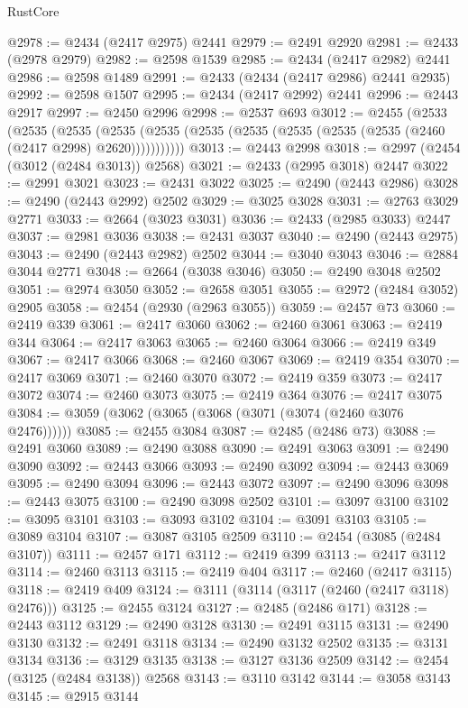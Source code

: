 \begin{lexlean}{RustCore}
\begin{coremodule}
@2978 := @2434 (@2417 @2975) @2441
@2979 := @2491 @2920
@2981 := @2433 (@2978 @2979)
@2982 := @2598 @1539
@2985 := @2434 (@2417 @2982) @2441
@2986 := @2598 @1489
@2991 := @2433 (@2434 (@2417 @2986) @2441 @2935)
@2992 := @2598 @1507
@2995 := @2434 (@2417 @2992) @2441
@2996 := @2443 @2917
@2997 := @2450 @2996
@2998 := @2537 @693
@3012 := @2455
    (@2533
      (@2535
        (@2535
          (@2535 (@2535 (@2535 (@2535 (@2535 (@2535 (@2535 (@2460 (@2417 @2998) @2620)))))))))))
@3013 := @2443 @2998
@3018 := @2997 (@2454 (@3012 (@2484 @3013)) @2568)
@3021 := @2433 (@2995 @3018) @2447
@3022 := @2991 @3021
@3023 := @2431 @3022
@3025 := @2490 (@2443 @2986)
@3028 := @2490 (@2443 @2992) @2502
@3029 := @3025 @3028
@3031 := @2763 @3029 @2771
@3033 := @2664 (@3023 @3031)
@3036 := @2433 (@2985 @3033) @2447
@3037 := @2981 @3036
@3038 := @2431 @3037
@3040 := @2490 (@2443 @2975)
@3043 := @2490 (@2443 @2982) @2502
@3044 := @3040 @3043
@3046 := @2884 @3044 @2771
@3048 := @2664 (@3038 @3046)
@3050 := @2490 @3048 @2502
@3051 := @2974 @3050
@3052 := @2658 @3051
@3055 := @2972 (@2484 @3052) @2905
@3058 := @2454 (@2930 (@2963 @3055))
@3059 := @2457 @73
@3060 := @2419 @339
@3061 := @2417 @3060
@3062 := @2460 @3061
@3063 := @2419 @344
@3064 := @2417 @3063
@3065 := @2460 @3064
@3066 := @2419 @349
@3067 := @2417 @3066
@3068 := @2460 @3067
@3069 := @2419 @354
@3070 := @2417 @3069
@3071 := @2460 @3070
@3072 := @2419 @359
@3073 := @2417 @3072
@3074 := @2460 @3073
@3075 := @2419 @364
@3076 := @2417 @3075
@3084 := @3059 (@3062 (@3065 (@3068 (@3071 (@3074 (@2460 @3076 @2476))))))
@3085 := @2455 @3084
@3087 := @2485 (@2486 @73)
@3088 := @2491 @3060
@3089 := @2490 @3088
@3090 := @2491 @3063
@3091 := @2490 @3090
@3092 := @2443 @3066
@3093 := @2490 @3092
@3094 := @2443 @3069
@3095 := @2490 @3094
@3096 := @2443 @3072
@3097 := @2490 @3096
@3098 := @2443 @3075
@3100 := @2490 @3098 @2502
@3101 := @3097 @3100
@3102 := @3095 @3101
@3103 := @3093 @3102
@3104 := @3091 @3103
@3105 := @3089 @3104
@3107 := @3087 @3105 @2509
@3110 := @2454 (@3085 (@2484 @3107))
@3111 := @2457 @171
@3112 := @2419 @399
@3113 := @2417 @3112
@3114 := @2460 @3113
@3115 := @2419 @404
@3117 := @2460 (@2417 @3115)
@3118 := @2419 @409
@3124 := @3111 (@3114 (@3117 (@2460 (@2417 @3118) @2476)))
@3125 := @2455 @3124
@3127 := @2485 (@2486 @171)
@3128 := @2443 @3112
@3129 := @2490 @3128
@3130 := @2491 @3115
@3131 := @2490 @3130
@3132 := @2491 @3118
@3134 := @2490 @3132 @2502
@3135 := @3131 @3134
@3136 := @3129 @3135
@3138 := @3127 @3136 @2509
@3142 := @2454 (@3125 (@2484 @3138)) @2568
@3143 := @3110 @3142
@3144 := @3058 @3143
@3145 := @2915 @3144

\end{coremodule}
\end{lexlean}
